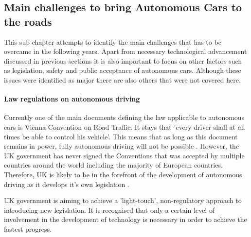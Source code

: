 \documentclass[11pt,english]{article}
\begin{document}




\par


\subsection{Main challenges to bring Autonomous Cars to the roads}
\par
This sub-chapter attempts to identify the main challenges that has to be overcame in the following years. Apart from necessary technological advancement discussed in previous sections it is also important to focus on other factors such as legislation, safety and public acceptance of autonomous cars. Although these issues were identified as major there are also others that were not covered here.


\paragraph{Law regulations on autonomous driving}

\par
Currently one of the main documents defining the law applicable to autonomous cars is Vienna Convention on Road Traffic. It stays that 'every driver shall at all times be able to control his vehicle'. This means that as long as this document remains in power, fully autonomous driving will not be possible \citep{vienna1}. However, the UK government has never signed the Conventions that was accepted by multiple countries around the world including the majority of European countries. Therefore, UK is likely to be in the forefront of the development of autonomous driving as it develops it's own legislation \citep{telegraph}.

\par


UK government is aiming to achieve a 'light-touch', non-regulatory approach to introducing new legislation. It is recognised that only a certain level of involvement in the development of technology is necessary in order to achieve the fastest progress.
\par
\end{document}

